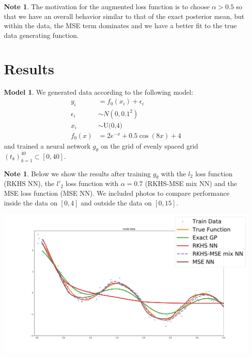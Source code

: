 \documentclass{article}
\theoremstyle{definition}
\newtheorem{note}[definition]{Note}
\newtheorem{modl}[definition]{Model}
\newcommand{\al}{\alpha}
\newcommand{\ep}{\epsilon}
\begin{document}
\begin{note}
The motivation for the augmented loss function is to choose $\al > 0.5$ so that we have an overall behavior similar to that of the exact posterior mean, but within the data, the MSE term dominates and we have a better fit to the true data generating function. 
\end{note}



\section{Results}

\begin{modl}
We generated data according to the following model:
\begin{align*}
y_i &= f_0(x_i) + \ep_i \\
\ep_i &\sim N(0, 0.1^2) \\
x_i & \sim \text{U(0,4)} \\
f_0(x) &= 2e^{-x} +  0.5 \cos(8x) + 4
\end{align*}
and trained a neural network $g_{\theta}$ on the grid of evenly spaced grid $(t_k)_{k=1}^{40} \subset [0,40]$.
\end{modl}

\begin{note}
Below we show the results after training $g_{\theta}$ with the $l_2$ loss function (RKHS NN), the $l'_2$ loss function with $\al = 0.7$ (RKHS-MSE mix NN) and the MSE loss function (MSE NN). We included photos to compare performance inside the data on $[0,4]$ and outside the data on $[0, 15]$. 
\end{note}


\includegraphics[scale=.35]{inside_data.pdf}
\end{document}
